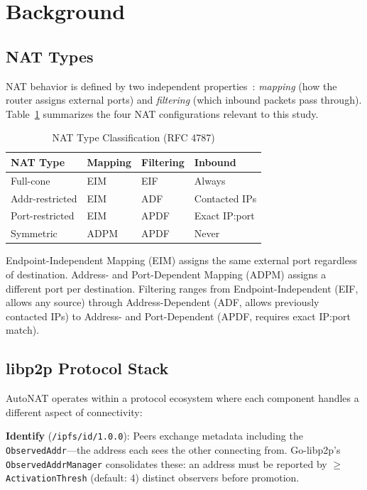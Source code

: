 \documentclass[conference]{IEEEtran}
\begin{document}
\section{Background}

\subsection{NAT Types}

NAT behavior is defined by two independent properties~\cite{rfc4787}: \emph{mapping} (how the router assigns external ports) and \emph{filtering} (which inbound packets pass through). Table~\ref{tab:nat-types} summarizes the four NAT configurations relevant to this study.

\begin{table}[htbp]
\caption{NAT Type Classification (RFC 4787)}
\label{tab:nat-types}
\centering
\begin{tabular}{@{}llll@{}}
\toprule
NAT Type & Mapping & Filtering & Inbound \\
\midrule
Full-cone & EIM & EIF & Always \\
Addr-restricted & EIM & ADF & Contacted IPs \\
Port-restricted & EIM & APDF & Exact IP:port \\
Symmetric & ADPM & APDF & Never \\
\bottomrule
\end{tabular}
\end{table}

Endpoint-Independent Mapping (EIM) assigns the same external port regardless of destination. Address- and Port-Dependent Mapping (ADPM) assigns a different port per destination. Filtering ranges from Endpoint-Independent (EIF, allows any source) through Address-Dependent (ADF, allows previously contacted IPs) to Address- and Port-Dependent (APDF, requires exact IP:port match).

\subsection{libp2p Protocol Stack}

AutoNAT operates within a protocol ecosystem where each component handles a different aspect of connectivity:

\textbf{Identify} (\texttt{/ipfs/id/1.0.0}): Peers exchange metadata including the \texttt{ObservedAddr}---the address each sees the other connecting from. Go-libp2p's \texttt{ObservedAddrManager} consolidates these: an address must be reported by $\geq$\texttt{ActivationThresh} (default: 4) distinct observers before promotion.
\end{document}
